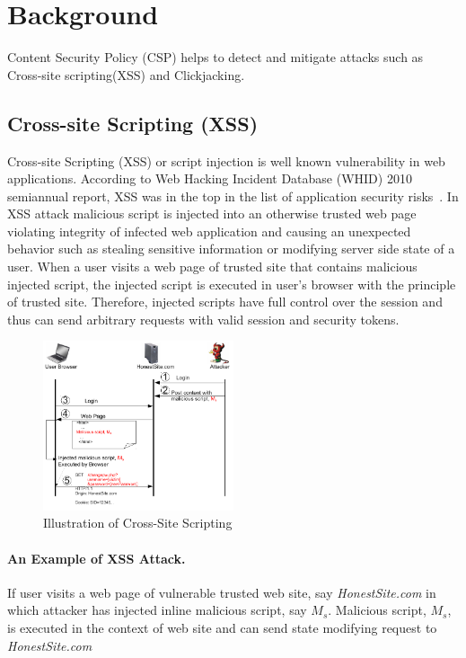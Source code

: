 \section{Background}
\label{sec:back}
Content Security Policy (CSP) helps to detect and mitigate attacks
such as Cross-site scripting(XSS) and Clickjacking.
 
\subsection{Cross-site Scripting (XSS)}
Cross-site Scripting (XSS) or script injection is well known
vulnerability in web applications. According to Web Hacking Incident
Database (WHID) 2010 semiannual report, XSS was in the top in the list
of application security risks~\cite{WHID-2010report}.  In XSS attack
malicious script is injected into an otherwise trusted web page
violating integrity of infected web application and causing an
unexpected behavior such as stealing sensitive information or
modifying server side state of a user. When a user visits a web page
of trusted site that contains malicious injected script, the injected
script is executed in user's browser with the principle of trusted
site. Therefore, injected scripts have full control over the session and
thus can send arbitrary requests with valid session and security
tokens.

\begin{figure}[h!]
\begin{center}
\includegraphics[width=0.5\textwidth]{xss-example}
\end{center}
\caption{Illustration of Cross-Site Scripting}
\label{fig:xssIll}
\end{figure}

\paragraph{\bf An Example of XSS Attack.}
If user visits a web page of vulnerable trusted web site, say {\em
  HonestSite.com} in which attacker has injected inline malicious
script, say $M_{s}$. Malicious script, $M_s$, is executed in the
context of web site and can send state modifying request to {\em
  HonestSite.com}

